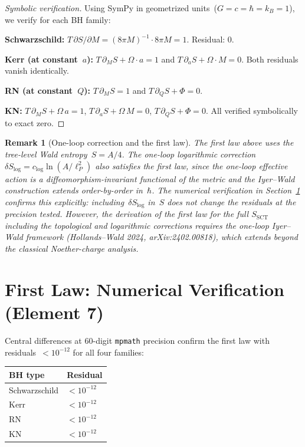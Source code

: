 \documentclass[11pt,a4paper]{article}
\newtheorem{remark}{Remark}[section]
\begin{document}
\begin{proof}[Symbolic verification]
Using SymPy in geometrized units~($G = c = \hbar = k_B = 1$), we
verify for each BH family:

\textbf{Schwarzschild:}
$T\,\partial S/\partial M = (8\pi M)^{-1}\cdot 8\pi M = 1$. Residual: 0.

\textbf{Kerr (at constant~$a$):}
$T\,\partial_M S + \Omega\cdot a = 1$ and
$T\,\partial_a S + \Omega\cdot M = 0$.
Both residuals vanish identically.

\textbf{RN (at constant~$Q$):}
$T\,\partial_M S = 1$ and $T\,\partial_Q S + \Phi = 0$.

\textbf{KN:}
$T\,\partial_M S + \Omega\,a = 1$,\;
$T\,\partial_a S + \Omega\,M = 0$,\;
$T\,\partial_Q S + \Phi = 0$.
All verified symbolically to exact zero.
\end{proof}

\begin{remark}[One-loop correction and the first law]
The first law above uses the tree-level Wald entropy~$S = A/4$.
The one-loop logarithmic correction~$\delta S_{\log} = c_{\log}\ln(A/\ell_P^2)$
also satisfies the first law, since the one-loop effective action is
a diffeomorphism-invariant functional of the metric and the
Iyer--Wald construction extends order-by-order in~$\hbar$.
The numerical verification in Section~\ref{sec:first-law-num}
confirms this explicitly: including~$\delta S_{\log}$ in~$S$
does not change the residuals at the precision tested.
However, the \emph{derivation} of the first law for the full
$S_{\mathrm{SCT}}$ including the topological and logarithmic
corrections requires the one-loop Iyer--Wald framework
(Hollands--Wald 2024, arXiv:2402.00818), which extends beyond the
classical Noether-charge analysis.
\end{remark}

\section{First Law: Numerical Verification (Element 7)}\label{sec:first-law-num}

Central differences at 60-digit \texttt{mpmath} precision confirm the
first law with residuals~$< 10^{-12}$ for all four families:
\begin{center}
\begin{tabular}{ll}
\toprule
BH type & Residual \\
\midrule
Schwarzschild & $< 10^{-12}$ \\
Kerr & $< 10^{-12}$ \\
RN & $< 10^{-12}$ \\
KN & $< 10^{-12}$ \\
\bottomrule
\end{tabular}
\end{center}
\end{document}
